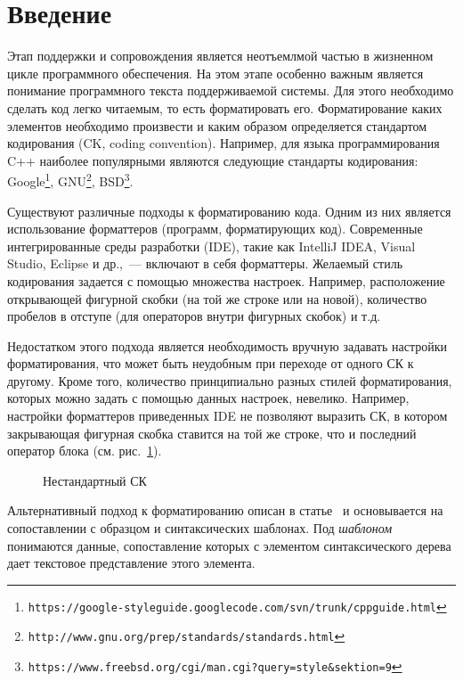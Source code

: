 \documentclass[conference]{IEEEtran}
\begin{document}
\section{Введение}
Этап поддержки и сопровождения является неотъемлмой частью в жизненном цикле программного обеспечения. %
На этом этапе особенно важным является понимание программного текста поддерживаемой системы. 
Для этого необходимо сделать код легко читаемым, то есть форматировать его.
Форматирование каких элементов необходимо произвести и каким образом определяется стандартом кодирования (CK, coding convention).
Например, для языка программирования C++ наиболее популярными являются следующие стандарты кодирования: Google\footnote{\texttt{https://google-styleguide.googlecode.com/svn/trunk/cppguide.html}}, GNU\footnote{\texttt{http://www.gnu.org/prep/standards/standards.html}}, BSD\footnote{\texttt{https://www.freebsd.org/cgi/man.cgi?query=style\&sektion=9}}.

Существуют различные подходы к форматированию кода. Одним из них является использование форматтеров (программ, форматирующих код).
Современные интегрированные среды разработки (IDE), такие как IntelliJ IDEA, Visual Studio, Eclipse и др.,~--- включают в себя форматтеры.
Желаемый стиль кодирования задается с помощью множества настроек. Например, расположение открывающей фигурной скобки (на той же строке или на новой), количество пробелов в отступе (для операторов внутри фигурных скобок) и т.д.

Недостатком этого подхода является необходимость вручную задавать настройки форматирования, что может быть неудобным при переходе от одного СК к другому.
Кроме того, количество принципиально разных стилей форматирования, которых можно задать с помощью данных настроек, невелико.
Например, настройки форматтеров приведенных IDE не позволяют выразить СК, в котором закрывающая фигурная скобка ставится на той же строке, что и последний оператор блока (см. рис.~\ref{fig:unusualCC}).
\begin{figure}[h]
	\centering
	
	\caption{Нестандартный СК}
	\label{fig:unusualCC}
\end{figure}

Альтернативный подход к форматированию описан в статье~\cite{while} и основывается на сопоставлении с образцом и синтаксических шаблонах.
Под \emph{шаблоном} понимаются данные, сопоставление которых с элементом синтаксического дерева дает текстовое представление этого элемента.
\end{document}
